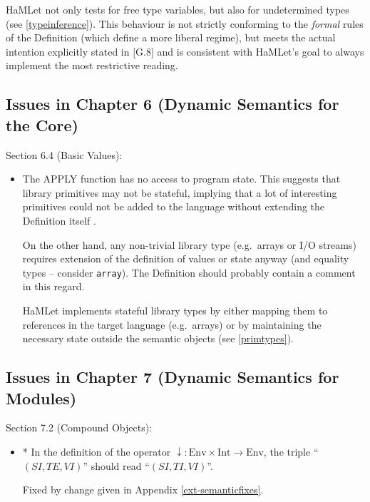 \documentclass[twoside,titlepage]{article}
\begin{document}
\begin{appendix}
\begin{itemize}
HaMLet not only tests for free type variables, but also for undetermined types (see \ref{typeinference}). This behaviour is not strictly conforming to the \emph{formal} rules of the Definition (which define a more liberal regime), but meets the actual intention explicitly stated in [G.8] and is consistent with HaMLet's goal to always implement the most restrictive reading.
\end{itemize}


\subsection{Issues in Chapter 6 (Dynamic Semantics for the Core)}
\label{bugschapter6}

Section 6.4 (Basic Values):

\begin{itemize}
\item The APPLY function has no access to program state. This suggests that library primitives may not be stateful, implying that a lot of interesting primitives could not be added to the language without extending the Definition itself \cite{mistakes}.

On the other hand, any non-trivial library type (e.g.\ arrays or I/O streams) requires extension of the definition of values or state anyway (and equality types -- consider {\tt array}). The Definition should probably contain a comment in this regard.

HaMLet implements stateful library types by either mapping them to references in the target language (e.g.\ arrays) or by maintaining the necessary state outside the semantic objects (see \ref{primtypes}).
\end{itemize}


\subsection{Issues in Chapter 7 (Dynamic Semantics for Modules)}
\label{bugschapter7}

Section 7.2 (Compound Objects):

\begin{itemize}

\item * In the definition of the operator $\downarrow:\mbox{Env}\times\mbox{Int}\to\mbox{Env}$, the triple ``$(\mathit{SI},\mathit{TE},\mathit{VI})$'' should read ``$(\mathit{SI},\mathit{TI},\mathit{VI})$''.

Fixed by change given in Appendix \ref{ext-semanticfixes}.


\end{itemize}
\end{appendix}
\end{document}
